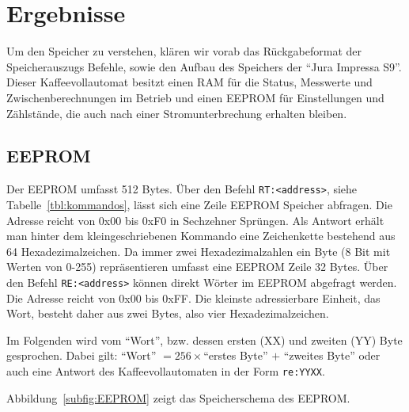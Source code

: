 \chapter{Ergebnisse} %

Um den Speicher zu verstehen, klären wir vorab das Rückgabeformat der Speicherauszugs Befehle, sowie den Aufbau des Speichers der "`Jura Impressa S9"'.
Dieser Kaffeevollautomat besitzt einen \ac{RAM} für die Status, Messwerte und Zwischenberechnungen im Betrieb und einen \ac{EEPROM} für Einstellungen und Zählstände, die auch nach einer Stromunterbrechung erhalten bleiben.

\section{EEPROM}
Der \acf{EEPROM} umfasst 512 Bytes.
Über den Befehl \texttt{RT:<address>}, siehe Tabelle~\ref{tbl:kommandos}, lässt sich eine Zeile \ac{EEPROM} Speicher abfragen.
Die Adresse reicht von 0x00 bis 0xF0 in Sechzehner Sprüngen.
Als Antwort erhält man hinter dem kleingeschriebenen Kommando eine Zeichenkette bestehend aus 64 Hexadezimalzeichen.
Da immer zwei Hexadezimalzahlen ein Byte (8 Bit mit Werten von 0-255) repräsentieren umfasst eine \ac{EEPROM} Zeile 32 Bytes.
Über den Befehl \texttt{RE:<address>} können direkt Wörter im \ac{EEPROM} abgefragt werden. Die Adresse reicht von 0x00 bis 0xFF.
Die kleinste adressierbare Einheit, das Wort, besteht daher aus zwei Bytes, also vier Hexadezimalzeichen.

Im Folgenden wird vom "`Wort"', bzw. dessen ersten (XX) und zweiten (YY) Byte gesprochen.
Dabei gilt: "`Wort"' $= 256\times$"`erstes Byte"' $ + $ "`zweites Byte"' oder auch eine Antwort des Kaffeevollautomaten in der Form \texttt{re:YYXX}.

Abbildung~\ref{subfig:EEPROM} zeigt das Speicherschema des \ac{EEPROM}.

